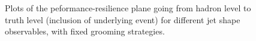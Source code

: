 \documentclass[11pt,letterpaper]{article}
\begin{document}
\begin{figure}
  \caption{Plots of the peformance-resilience plane going from hadron level to truth level (inclusion of underlying event) for different jet shape observables, with fixed grooming strategies.}\label{jetsub_2prong_fig:shapes-UE}
\end{figure}
\end{document}
